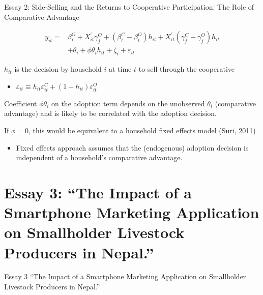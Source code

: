 \documentclass[aspectratio=169]{beamer}
\newenvironment{wideitemize}{\itemize\addtolength{\itemsep}{10pt}}{\enditemize}
\begin{document}
\begin{frame}{Essay 2: Side-Selling and the Returns to Cooperative Participation: The Role of Comparative Advantage}

\addtocounter{equation}{-1}
\begin{equation} \label{eq:E2_spec}
    \begin{split}
    y_{it} = & \beta^{O}_{t} + X^{\prime}_{it}\gamma^{O}_{j} + (\beta^{C}_{t} - \beta^{O}_{t})h_{it} +  X^{\prime}_{it}(\gamma^{C}_{j} - \gamma^{O}_{j})h_{it} \\
    & + \theta_{i} + \phi\theta_{i}h_{it} + \zeta_i + \varepsilon_{it}
    \end{split}
\end{equation}

\begin{wideitemize}
    \item $h_{it}$ is the decision by household $i$ at time $t$ to sell through the cooperative
        \begin{itemize}
            \item $\varepsilon_{it} \equiv h_{it}\varepsilon^{C}_{it} + (1-h_{it})\varepsilon^{O}_{it}$
        \end{itemize}
    \item Coefficient $\phi\theta_{i}$ on the adoption term depends on the unobserved $\theta_{i}$ (comparative advantage) and is likely to be correlated with the adoption decision. 
    \item If $\phi = 0$, this would be equivalent to a household fixed effects model (Suri, 2011)
        \begin{itemize}
            \item Fixed effects approach assumes that the (endogenous) adoption decision is independent of a household’s comparative advantage.
        \end{itemize}
\end{wideitemize}
\end{frame}

\section{Essay 3: ``The Impact of a Smartphone Marketing Application on Smallholder Livestock Producers in Nepal.''}

\begin{frame}{Essay 3}
\centering
\Large{``The Impact of a Smartphone Marketing Application on Smallholder Livestock Producers in Nepal.''}
\end{frame}
\end{document}
